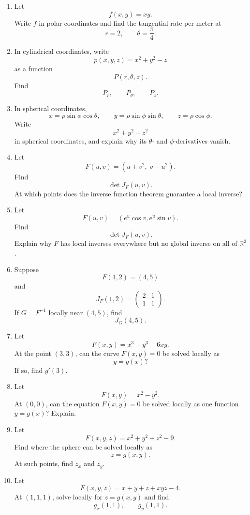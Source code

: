 \begin{enumerate}
\item Let
\[
    f(x,y)=xy.
\]
Write \(f\) in polar coordinates and find the tangential rate per meter at
\[
    r=2,\qquad \theta=\frac{\pi}{4}.
\]

\item In cylindrical coordinates, write
\[
    p(x,y,z)=x^2+y^2-z
\]
as a function
\[
    P(r,\theta,z).
\]
Find
\[
    P_r,\qquad P_\theta,\qquad P_z.
\]

\item In spherical coordinates,
\[
    x=\rho\sin\phi\cos\theta,
    \qquad
    y=\rho\sin\phi\sin\theta,
    \qquad
    z=\rho\cos\phi.
\]
Write
\[
    x^2+y^2+z^2
\]
in spherical coordinates, and explain why its \(\theta\)- and \(\phi\)-derivatives vanish.

\item Let
\[
    F(u,v)=(u+v^2,\;v-u^2).
\]
Find
\[
    \det J_F(u,v).
\]
At which points does the inverse function theorem guarantee a local inverse?

\item Let
\[
    F(u,v)=(e^u\cos v,e^u\sin v).
\]
Find
\[
    \det J_F(u,v).
\]
Explain why \(F\) has local inverses everywhere but no global inverse on all of
\(\mathbb R^2\).

\item Suppose
\[
    F(1,2)=(4,5)
\]
and
\[
    J_F(1,2)=
    \begin{pmatrix}
        2 & 1\\
        1 & 1
    \end{pmatrix}.
\]
If \(G=F^{-1}\) locally near \((4,5)\), find
\[
    J_G(4,5).
\]

\item Let
\[
    F(x,y)=x^3+y^3-6xy.
\]
At the point \((3,3)\), can the curve \(F(x,y)=0\) be solved locally as
\[
    y=g(x)?
\]
If so, find \(g'(3)\).

\item Let
\[
    F(x,y)=x^2-y^2.
\]
At \((0,0)\), can the equation \(F(x,y)=0\) be solved locally as one function
\(y=g(x)\)?  Explain.

\item Let
\[
    F(x,y,z)=x^2+y^2+z^2-9.
\]
Find where the sphere can be solved locally as
\[
    z=g(x,y).
\]
At such points, find \(z_x\) and \(z_y\).

\item Let
\[
    F(x,y,z)=x+y+z+xyz-4.
\]
At \((1,1,1)\), solve locally for \(z=g(x,y)\) and find
\[
    g_x(1,1),
    \qquad
    g_y(1,1).
\]


\end{enumerate}
